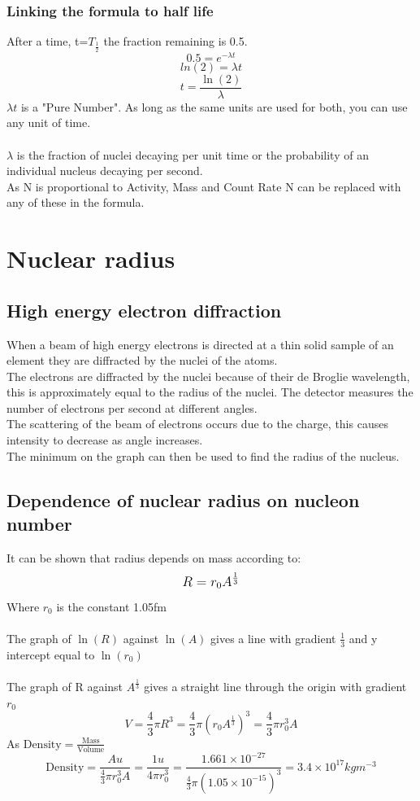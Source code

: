 \documentclass{article}[18pt]
\begin{document}
\subsubsection{Linking the formula to half life}
After a time, t=$T_{\frac{1}{2}}$ the fraction remaining is 0.5.
$$0.5=e^{-\lambda t}$$
$$ln(2)=\lambda t$$
$$t=\frac{\ln(2)}{\lambda}$$
$\lambda t$ is a "Pure Number". As long as the same units are used for both, you can use any unit of time.\\
\\
$\lambda$ is the fraction of nuclei decaying per unit time or the probability of an individual nucleus decaying per second.\\
As N is proportional to Activity, Mass and Count Rate N can be replaced with any of these in the formula.
\section{Nuclear radius}
\subsection{High energy electron diffraction}
When a beam of high energy electrons is directed at a thin solid sample of an element they are diffracted by the nuclei of the atoms.\\
The electrons are diffracted by the nuclei because of their de Broglie wavelength, this is approximately equal to the radius of the nuclei. The detector measures the number of electrons per second at different angles.\\
The scattering of the beam of electrons occurs due to the charge, this causes intensity to decrease as angle increases.\\
The minimum on the graph can then be used to find the radius of the nucleus.
\subsection{Dependence of nuclear radius on nucleon number}
It can be shown that radius depends on mass according to:
$$\mathlarger{R=r_0A^{\frac{1}{3}}}$$
Where $r_0$ is the constant 1.05fm\\
\\
The graph of $\ln(R)$ against $\ln(A)$ gives a line with gradient $\frac{1}{3}$ and y intercept equal to $\ln(r_0)$\\
\\
The graph of R against $A^{\frac{1}{3}}$ gives a straight line through the origin with gradient $r_0$\\
$$V=\frac{4}{3}\pi R^3=\frac{4}{3}\pi(r_0A^{\frac{1}{3}})^3=\frac{4}{3}\pi r_0^3A$$
As $\textrm{Density}=\frac{\textrm{Mass}}{\textrm{Volume}}$
$$\textrm{Density}=\frac{Au}{\frac{4}{3}\pi r_0^3A}=\frac{1u}{4\pi r_0^3}=\frac{1.661\times10^{-27}}{\frac{4}{3}\pi(1.05\times10^{-15})^3}=3.4\times10^{17}kgm^{-3}$$
\end{document}
